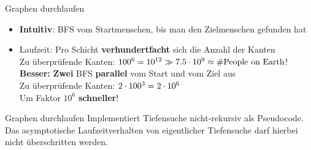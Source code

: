 \begin{frame}{Graphen durchlaufen}
	\solutionheading
	\begin{itemize}
		\item<+-> \textbf{Intuitiv}: BFS vom Startmenschen, bis man den Zielmenschen gefunden hat
		\item<+->[\Cons\symbitemnegoffset] Laufzeit: Pro Schicht \textbf{verhundertfacht} sich die Anzahl der Kanten \\
			\impl Zu überprüfende Kanten: \quad $100^6 = 10^{12} \gg 7.5 \cdot 10^9 \approx \text{\#People on Earth}$!
		\implitem<+-> \textbf{Besser: } \textbf{Zwei} BFS \textbf{parallel} vom Start und vom Ziel aus \\
			\impl Zu überprüfende Kanten: \quad $2 \cdot 100^3 = 2 \cdot 10^6$ \\
			\impl Um Faktor $10^6$ \textbf{schneller}!
	\end{itemize}
\end{frame}


\begin{frame}{Graphen durchlaufen}
	Implementiert Tiefensuche nicht-rekursiv als Pseudocode. Das asymptotische Laufzeitverhalten von eigentlicher Tiefensuche darf hierbei nicht überschritten werden.
\end{frame}


